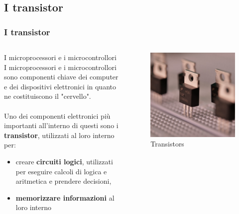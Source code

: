 \subsection[I transistor]{I transistor}
\begin{frame}
	\frametitle{I transistor}
	
	\begin{columns}			
		\begin{block}{I microprocessori e i microcontrollori}
			I microprocessori e i microcontrollori sono componenti chiave dei computer e dei dispositivi elettronici in quanto ne costituiscono il "cervello".\\~\\
			Uno dei componenti elettronici più importanti all'interno di questi sono i \textbf{transistor}, utilizzati al loro interno per:
			\begin{itemize}
				\item creare \textbf{circuiti logici}, utilizzati per eseguire calcoli di logica e aritmetica e prendere decisioni,
				\item \textbf{memorizzare informazioni} al loro interno
			\end{itemize} 
		\end{block}
		
		\begin{figure}[!htbp]
			\centering 
			\includegraphics[width=0.95\linewidth]{images/2_elettronica/transistor.jpg}
			\caption{Transistors}
			\label{fig:electronics_transistors}
		\end{figure}		
	\end{columns}
	
\end{frame}




